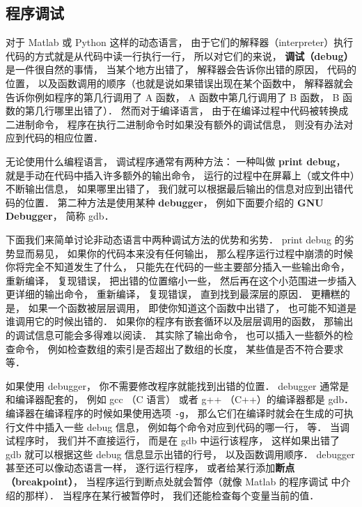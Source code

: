 
\subsection{程序调试}

对于 Matlab 或 Python 这样的动态语言， 由于它们的解释器（interpreter）执行代码的方式就是从代码中读一行执行一行， 所以对它们的来说， \textbf{调试（debug）}是一件很自然的事情， 当某个地方出错了， 解释器会告诉你出错的原因， 代码的位置， 以及函数调用的顺序（也就是说如果错误出现在某个函数中， 解释器就会告诉你例如程序的第几行调用了 A 函数， A 函数中第几行调用了 B 函数， B 函数的第几行哪里出错了）． 然而对于编译语言， 由于在编译过程中代码被转换成二进制命令， 程序在执行二进制命令时如果没有额外的调试信息， 则没有办法对应到代码的相应位置．

无论使用什么编程语言， 调试程序通常有两种方法： 一种叫做 \textbf{print debug}， 就是手动在代码中插入许多额外的输出命令， 运行的过程中在屏幕上（或文件中）不断输出信息， 如果哪里出错了， 我们就可以根据最后输出的信息对应到出错代码的位置． 第二种方法是使用某种 \textbf{debugger}， 例如下面要介绍的 \textbf{GNU Debugger}， 简称 gdb．

下面我们来简单讨论非动态语言中两种调试方法的优势和劣势． print debug 的劣势显而易见， 如果你的代码本来没有任何输出， 那么程序运行过程中崩溃的时候你将完全不知道发生了什么， 只能先在代码的一些主要部分插入一些输出命令， 重新编译， 复现错误， 把出错的位置缩小一些， 然后再在这个小范围进一步插入更详细的输出命令， 重新编译， 复现错误， 直到找到最深层的原因． 更糟糕的是， 如果一个函数被层层调用， 即使你知道这个函数中出错了， 也可能不知道是谁调用它的时候出错的． 如果你的程序有嵌套循环以及层层调用的函数， 那输出的调试信息可能会多得难以阅读． 其实除了输出命令， 也可以插入一些额外的检查命令， 例如检查数组的索引是否超出了数组的长度， 某些值是否不符合要求等．

如果使用 debugger， 你不需要修改程序就能找到出错的位置． debugger 通常是和编译器配套的， 例如 gcc （C 语言） 或者 g++ （C++）的编译器都是 gdb． 编译器在编译程序的时候如果使用选项 \verb|-g|， 那么它们在编译时就会在生成的可执行文件中插入一些 debug 信息， 例如每个命令对应到代码的哪一行， 等． 当调试程序时， 我们并不直接运行， 而是在 gdb 中运行该程序， 这样如果出错了 gdb 就可以根据这些 debug 信息显示出错的行号， 以及函数调用顺序． debugger 甚至还可以像动态语言一样， 逐行运行程序， 或者给某行添加\textbf{断点（breakpoint）}， 当程序运行到断点处就会暂停（就像 Matlab 的程序调试 中介绍的那样）． 当程序在某行被暂停时， 我们还能检查每个变量当前的值．


